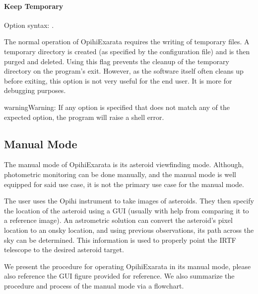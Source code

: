 \documentclass[letterpaper,11pt,english]{sphinxmanual}
\begin{document}
\paragraph{Keep Temporary}
\label{\detokenize{user/command_line:keep-temporary}}
\sphinxAtStartPar
Option syntax: .

\sphinxAtStartPar
The normal operation of OpihiExarata requires the writing of temporary files.
A temporary directory is created (as specified by the configuration file) and
is then purged and deleted. Using this flag prevents the cleanup of the
temporary directory on the program’s exit. However, as the software itself often
cleans up before exiting, this option is not very useful for the end user. It
is more for debugging purposes.

\begin{sphinxadmonition}{warning}{Warning:}
\sphinxAtStartPar
If any option is specified that does not match any of the expected option,
the program will raise a shell error.
\end{sphinxadmonition}

\sphinxstepscope


\subsection{Manual Mode}
\label{\detokenize{user/manual_mode:manual-mode}}\label{\detokenize{user/manual_mode:user-manual-mode}}\label{\detokenize{user/manual_mode::doc}}
\sphinxAtStartPar
The manual mode of OpihiExarata is its asteroid view\sphinxhyphen{}finding mode. Although,
photometric monitoring can be done manually, and the manual mode is well
equipped for said use case, it is not the primary use case for the manual mode.

\sphinxAtStartPar
The user uses the Opihi instrument to take images of asteroids. They then
specify the location of the asteroid using a GUI (usually with help from
comparing it to a reference image). An astrometric solution can convert the
asteroid’s pixel location to an on\sphinxhyphen{}sky location, and using previous
observations, its path across the sky can be determined. This information is
used to properly point the IRTF telescope to the desired asteroid target.

\sphinxAtStartPar
We present the procedure for operating OpihiExarata in its manual mode,
please also reference the GUI figure provided for reference. We also summarize
the procedure and process of the manual mode via a flowchart.
\end{document}
